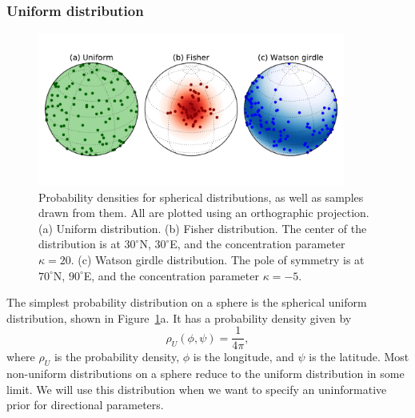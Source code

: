\documentclass[preprint,12pt,authoryear]{elsarticle}
\begin{document}
\subsubsection{Uniform distribution}
\begin{figure}
\includegraphics[width=0.9\textwidth]{figures/cartoon/distributions.pdf}
\caption[Spherical probability distributions.]{Probability densities for spherical distributions, as well as samples drawn from them. All are plotted using an orthographic projection. (a) Uniform distribution. (b) Fisher distribution. The center of the distribution is at $30^\circ$N, $30^\circ$E, and the concentration parameter $\kappa=20$. (c) Watson girdle distribution. The pole of symmetry is at $70^\circ$N, $90^\circ$E, and the concentration parameter $\kappa=-5$.}
\label{fig:distributions}
\end{figure}

The simplest probability distribution on a sphere is the spherical uniform distribution, shown in Figure~\ref{fig:distributions}a.
It has a probability density given by
\begin{equation}
  \rho_U(\phi, \psi) = \frac{1}{4 \pi},
\end{equation}
where $\rho_U$ is the probability density, $\phi$ is the longitude, and $\psi$ is the latitude.
Most non-uniform distributions on a sphere reduce to the uniform distribution in some limit.
We will use this distribution when we want to specify an uninformative prior for directional parameters.
\end{document}
